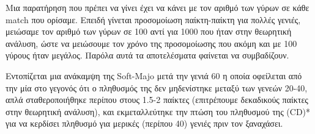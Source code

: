 \documentclass[a4paper,12pt]{article}
\begin{document}
Μια παρατήρηση που πρέπει να γίνει έχει να κάνει με τον αριθμό των γύρων σε κάθε \foreignlanguage{english}{match} που ορίσαμε. Επειδή γίνεται προσομοίωση παίκτη-παίκτη για πολλές γενιές, μειώσαμε τον αριθμό των γύρων σε 100 αντί για 1000 που ήταν στην θεωρητική ανάλυση, ώστε να μειώσουμε τον χρόνο της προσομοίωσης που ακόμη και με 100 γύρους ήταν μεγάλος. Παρόλα αυτά τα αποτελέσματα φαίνεται να συμβαδίζουν.

Εντοπίζεται μια ανάκαμψη της \foreignlanguage{english}{Soft-Majo} μετά την γενιά 60 η οποία οφείλεται από την μία στο γεγονός ότι ο πληθυσμός της δεν μηδενίστηκε μεταξύ των γενεών 20-40, απλά σταθεροποιήθηκε περίπου στους 1.5-2 παίκτες (επιτρέπουμε δεκαδικούς παίκτες στην θεωρητική ανάλυση), και εκμεταλλεύτηκε την πτώση του πληθυσμού της \foreignlanguage{english}{(CD)*} για να κερδίσει πληθυσμό για μερικές (περίπου 40) γενιές πριν τον ξαναχάσει.
\end{document}
